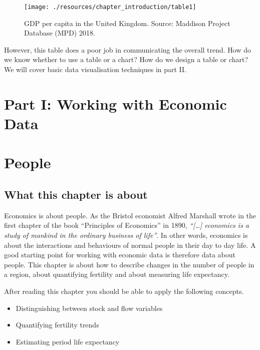 \documentclass[
]{book}
\providecommand{\tightlist}{%
  \setlength{\itemsep}{0pt}\setlength{\parskip}{0pt}}
\begin{document}
\begin{figure}

{\centering \texttt{[image: ./resources/chapter\_introduction/table1]} 

}

\caption{GDP per capita in the United Kingdom. Source: Maddison Project Database (MPD) 2018.}\label{fig:fig2}
\end{figure}

However, this table does a poor job in communicating the overall trend. How do we know whether to use a table or a chart? How do we design a table or chart? We will cover basic data visualisation techniques in part II.

\hypertarget{part-i-working-with-economic-data}{%
\chapter*{Part I: Working with Economic Data}\label{part-i-working-with-economic-data}}

\hypertarget{po}{%
\chapter{People}\label{po}}

\hypertarget{what-this-chapter-is-about}{%
\section{What this chapter is about}\label{what-this-chapter-is-about}}

Economics is about people. As the Bristol economist Alfred Marshall wrote in the first chapter of the book ``Principles of Economics'' in 1890, \emph{``{[}\ldots{]} economics is a study of mankind in the ordinary business of life''}. In other words, economics is about the interactions and behaviours of normal people in their day to day life. A good starting point for working with economic data is therefore data about people. This chapter is about how to describe changes in the number of people in a region, about quantifying fertility and about measuring life expectancy.

After reading this chapter you should be able to apply the following concepts.

\begin{itemize}
\tightlist
\item
  Distinguishing between stock and flow variables
\item
  Quantifying fertility trends
\item
  Estimating period life expectancy
\end{itemize}
\end{document}
